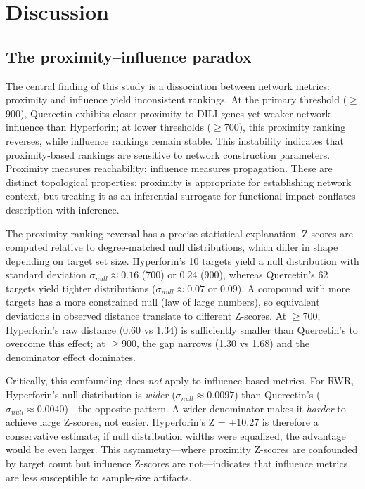 \section{Discussion}

\subsection{The proximity--influence paradox}

The central finding of this study is a dissociation between network metrics: proximity and influence yield inconsistent rankings.
At the primary threshold ($\geq$900), Quercetin exhibits closer proximity to DILI genes yet weaker network influence than Hyperforin; at lower thresholds ($\geq$700), this proximity ranking reverses, while influence rankings remain stable.
This instability indicates that proximity-based rankings are sensitive to network construction parameters.
Proximity measures reachability; influence measures propagation.
These are distinct topological properties; proximity is appropriate for establishing network context, but treating it as an inferential surrogate for functional impact conflates description with inference.

The proximity ranking reversal has a precise statistical explanation.
Z-scores are computed relative to degree-matched null distributions, which differ in shape depending on target set size.
Hyperforin's 10 targets yield a null distribution with standard deviation $\sigma_{null} \approx 0.16$ (700) or $0.24$ (900), whereas Quercetin's 62 targets yield tighter distributions ($\sigma_{null} \approx 0.07$ or $0.09$).
A compound with more targets has a more constrained null (law of large numbers), so equivalent deviations in observed distance translate to different Z-scores.
At $\geq$700, Hyperforin's raw distance (0.60 vs 1.34) is sufficiently smaller than Quercetin's to overcome this effect; at $\geq$900, the gap narrows (1.30 vs 1.68) and the denominator effect dominates.

Critically, this confounding does \textit{not} apply to influence-based metrics.
For RWR, Hyperforin's null distribution is \textit{wider} ($\sigma_{null} \approx 0.0097$) than Quercetin's ($\sigma_{null} \approx 0.0040$)---the opposite pattern.
A wider denominator makes it \textit{harder} to achieve large Z-scores, not easier.
Hyperforin's Z = +10.27 is therefore a conservative estimate; if null distribution widths were equalized, the advantage would be even larger.
This asymmetry---where proximity Z-scores are confounded by target count but influence Z-scores are not---indicates that influence metrics are less susceptible to sample-size artifacts.

